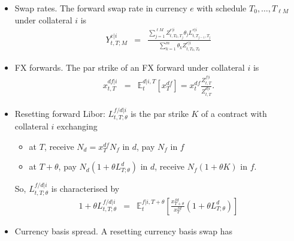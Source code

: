 \documentclass[11pt,english]{amsart}
\newcommand{\EE}{\mathbb{E}}
\newcommand{\f}{\ell}
\theoremstyle{definition}
\begin{document}
\begin{itemize}
\begin{eqnarray}
	1 - \theta S^{e|i,\div}_{t,T;\theta} &=& \frac{1+\theta L^{e|i}_{t,T;\theta}}{1+\theta R^{e|i}_{t,T;\theta}}  
	\label{eq:multiplicative_funding_spread}
\end{eqnarray} 
\item Swap rates. The forward swap rate in currency $e$ with schedule $T_0,\ldots,T_{\f M}$ under collateral $i$ is 
\begin{eqnarray}
  Y^{e|i}_{t,T;M}	&=&  \frac{\sum_{j=1}^{\f M} Z^{e|i}_{t,T_0,T_j} \theta_j L^{e|i}_{t,T_{j-1},T_j}}{\sum_{k=1}^{m} \theta_k Z^{e|i}_{t,T_0,T_k} }
    \label{eq:forward_swap_rate}
\end{eqnarray} 
\item FX forwards. The par strike of an FX forward under collateral $i$ is 
\begin{eqnarray}
  x^{df|i}_{t,T } &=& \EE^{d|i,T}_t \left[x^{df}_{T}\right]  = x^{df}_{t}\frac{Z^{f|i}_{t,T}}{Z^{d|i}_{t,T}}. 
  \label{eq:fx_forward}
\end{eqnarray} 
\item Resetting forward Libor:  $L^{f/d|i}_{t,T;\theta}$ is the par strike $K$ of a contract with collateral $i$ exchanging 
\begin{itemize}
\item at $T$, receive $N_d = x^{df}_T N_f$ in $d$, pay $N_f$ in $f$
\item at $T+\theta$, pay $N_d(1+\theta L^d_{T;\theta})$ in $d$, receive $N_f(1+\theta K)$ in $f$.   
\end{itemize}
So, $L^{f/d|i}_{t,T;\theta}$ is characterised by 
\begin{eqnarray*}
   1 + \theta L^{f/d|i}_{t,T;\theta} 
   &=& \EE^{f|i,T+\theta}_t\left[ \frac{x^{fd}_{T+\theta}}{x^{fd}_{T}} (1+\theta L^{d}_{T;\theta}) \right] 
\end{eqnarray*} 
\item Currency basis spread. A resetting currency basis swap has

\end{itemize}
\end{document}
